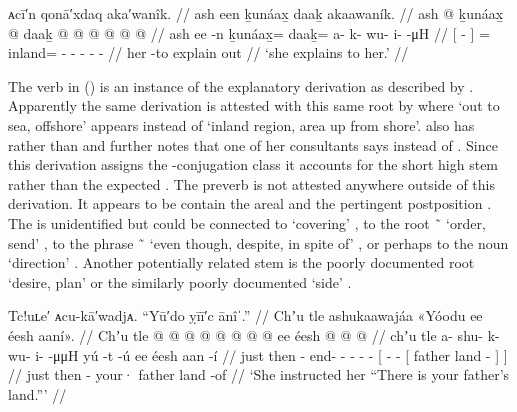 \ex\label{ex:89-37-she-explain-to-her}%
%
\begingl
	\glpreamble	ᴀcī′n qonā′xdaq aka′wanîk. //
	\glpreamble	ash een ḵunáax̱ daaḵ akaawaník. //
	\gla	{} ash  @ {} {}
		ḵunáax̱ @ daaḵ @  @ {} @ {} @ {} @ {} @ {} //
	\glb	{} ash ee -n {}
		ḵunáax̱= daaḵ= a- k- wu- i-  -μH //
	\glc	{}[   - {}]
		= inland= - - - -  - //
	\gld	{} her {} -to {}
		explain out  {} {} {} {} {} //
	\glft	‘she explains to her.’
		//
\endgl
\xe

The verb  in (\lastx) is an instance of the explanatory derivation  as described by \textcite[220]{leer:1991}.
Apparently the same derivation is attested with this same root  by \textcite[83]{story-naish:1973} where  ‘out to sea, offshore’ appears instead of  ‘inland region, area up from shore’.
\textcite{eggleston:2017} also has  rather than  and further notes that one of her consultants says  instead of .
Since this derivation assigns the -conjugation class it accounts for the short high stem  rather than the expected .
The preverb  is not attested anywhere outside of this derivation.
It appears to be contain the areal  and the pertingent postposition .
The  is unidentified but could be connected to  ‘covering’ \parencite[04/28, 03/121]{leer:1973}, to the root  \~\  ‘order, send’ \parencite[04/22–25]{leer:1973}, to the phrase  \~\  ‘even though, despite, in spite of’ \parencite[04/27]{leer:1973}, or perhaps to the noun  ‘direction’ \parencite[03/120–125]{leer:1973}.
Another potentially related stem is the poorly documented root  ‘desire, plan’ \parencite[03/172]{leer:1973} or the similarly poorly documented  ‘side’ \parencites[03/173]{leer:1973}[10]{leer:1978b}.

\ex\label{ex:89-38-she-explain-to-her}%
%
\begingl
	\glpreamble	Tc!uʟe′ ᴀcu-kā′wadjᴀ. “Yū′do ỵīī′c ānîˈ.” //
	\glpreamble	Chʼu tle ashukaawajáa «\!Yóodu ee éesh aaní\!». //
	\gla	Chʼu tle  @ {} @ {} @ {} @ {} @ {} @ {}
		{}  @ {} @ {}
			{} ee éesh  @ {} @ {} @ {} //
	\glb	chʼu tle a- shu- k- wu- i-  -μμH
		{} yú -t -ú
			{} ee éesh aan -í {} {} //
	\glc	just then - end- - - -  -
		{}[  - -
			{}[  father land - {}] {}] //
	\gld	just then  {} {} {} {} {} {}
		{}  - {}
			{} your· father land -of {} //
	\glft	‘She instructed her “There is your father’s land.”’
		//
\endgl
\xe

